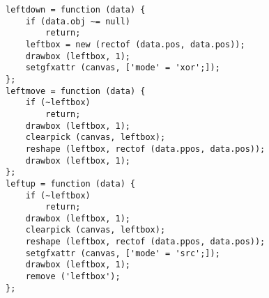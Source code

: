 \begin{verbatim}
leftdown = function (data) {
    if (data.obj ~= null)
        return;
    leftbox = new (rectof (data.pos, data.pos));
    drawbox (leftbox, 1);
    setgfxattr (canvas, ['mode' = 'xor';]);
};
leftmove = function (data) {
    if (~leftbox)
        return;
    drawbox (leftbox, 1);
    clearpick (canvas, leftbox);
    reshape (leftbox, rectof (data.ppos, data.pos));
    drawbox (leftbox, 1);
};
leftup = function (data) {
    if (~leftbox)
        return;
    drawbox (leftbox, 1);
    clearpick (canvas, leftbox);
    reshape (leftbox, rectof (data.ppos, data.pos));
    setgfxattr (canvas, ['mode' = 'src';]);
    drawbox (leftbox, 1);
    remove ('leftbox');
};
\end{verbatim}
